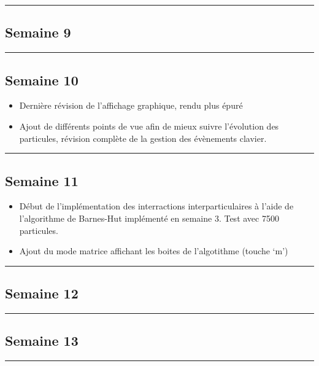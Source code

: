 \documentclass[12pt, letterpaper, twoside]{article}
\begin{document}
\rule{\textwidth}{0.4pt}

\subsection{Semaine 9 }

\rule{\textwidth}{0.4pt}

\subsection{Semaine 10 }
\begin{itemize}
\item Dernière révision de l'affichage graphique, rendu plus épuré
\item Ajout de différents points de vue afin de mieux suivre l'évolution des particules, révision complète de la gestion des évènements clavier.
\end{itemize}

\rule{\textwidth}{0.4pt}

\subsection{Semaine 11 }

\begin{itemize}
\item Début de l'implémentation des interractions interparticulaires à l'aide de l'algorithme de Barnes-Hut implémenté en semaine 3. Test avec 7500 particules. 
\item Ajout du mode matrice affichant les boites de l'algotithme (touche `m')
\end{itemize}

\rule{\textwidth}{0.4pt}

\subsection{Semaine 12 }

\rule{\textwidth}{0.4pt}

\subsection{Semaine 13 }

\rule{\textwidth}{0.4pt}
\end{document}
